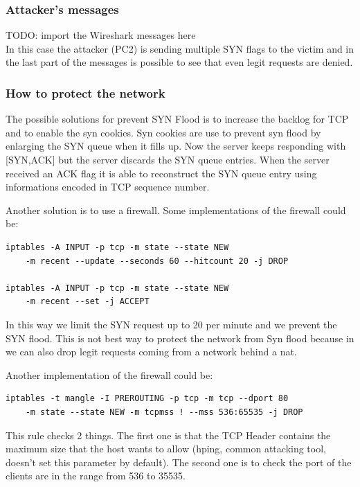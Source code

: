 \subsubsection{Attacker's messages}

{\huge{TODO: import the Wireshark messages here}}\\

In this case the attacker (PC2) is sending multiple SYN flags to the victim and in the last part of the messages is possible to see that even legit requests are denied.\par

\subsubsection{How to protect the network}
The possible solutions for prevent SYN Flood is to increase the backlog for TCP and to enable the syn cookies. Syn cookies are use to prevent syn flood by enlarging the SYN queue when it fills up. Now the server keeps responding with [SYN,ACK] but the server discards the SYN queue entries. When the server received an ACK flag it is able to reconstruct the SYN queue entry using informations encoded in TCP sequence number.\par
Another solution is to use a firewall. Some implementations of the firewall could be:\\
\begin{lstlisting}
iptables -A INPUT -p tcp -m state --state NEW
    -m recent --update --seconds 60 --hitcount 20 -j DROP

iptables -A INPUT -p tcp -m state --state NEW
    -m recent --set -j ACCEPT
\end{lstlisting}
In this way we limit the SYN request up to 20 per minute and we prevent the SYN flood. This is not best way to protect the network from Syn flood because in we can also drop legit requests coming from a network behind a nat.\par
Another implementation of the firewall could be:\\
\begin{lstlisting}
iptables -t mangle -I PREROUTING -p tcp -m tcp --dport 80
    -m state --state NEW -m tcpmss ! --mss 536:65535 -j DROP
\end{lstlisting}
This rule checks 2 things. The first one is that the TCP Header contains the maximum size that the host wants to allow (hping, common attacking tool, doesn’t set this parameter by default). The second one is to check the port of the clients are in the range from 536 to 35535.\par

